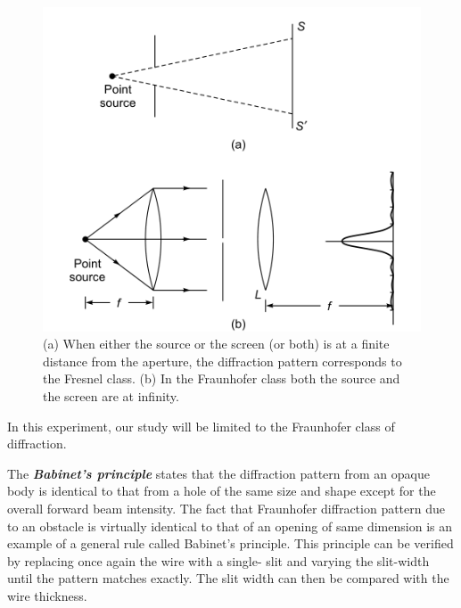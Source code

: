 \documentclass{article}
\begin{document}
\begin{figure}[h!]
    \centering
    \includegraphics[scale = 0.85]{Figures/fraun&fresnel.png}
    \captionsetup{justification=centering}
    \caption{(a) When either the source or the screen (or both) is at a finite distance from the aperture, the diffraction pattern corresponds to the Fresnel class. (b) In the Fraunhofer class both the source and the screen are at infinity.}
    \label{fig:fraun&fresnel}
\end{figure}
\par
\noindent
In this experiment, our study will be limited to the Fraunhofer class of diffraction.
\par
\noindent
The \textbf{\textit{Babinet's principle}} states that the diffraction pattern from an opaque body is identical to that from a hole of the same size and shape except for the overall forward beam intensity. The fact that Fraunhofer diffraction pattern due to an obstacle is virtually 
identical to that of an opening of same dimension is an example of a general rule called 
Babinet's principle. This principle can be verified by replacing once again the wire with a 
single- slit and varying the slit-width until the pattern matches exactly. The slit width can then 
be compared with the wire thickness. 
\end{document}
